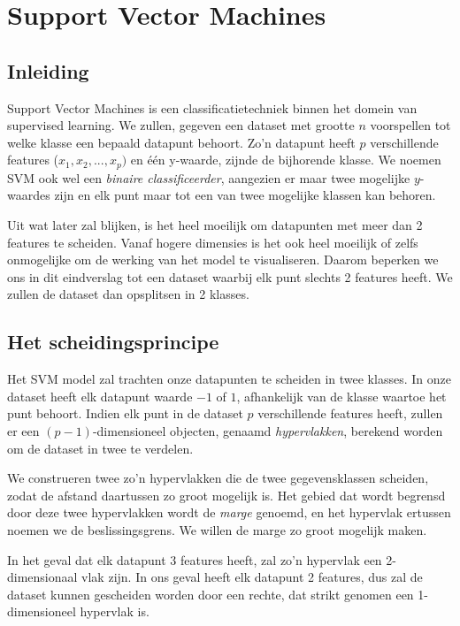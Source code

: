 \documentclass[TeamE-eindrapport]{subfiles}
\begin{document}
	
\chapter{Support Vector Machines}

\section{Inleiding}

Support Vector Machines is een classificatietechniek binnen het domein van supervised learning. We zullen, gegeven een dataset met grootte \(n\) voorspellen tot welke klasse een bepaald datapunt behoort. Zo'n datapunt heeft \(p\) verschillende features (\(x_1, x_2, ..., x_p)\) en één y-waarde, zijnde de bijhorende klasse. We noemen SVM ook wel een \textit{binaire classificeerder}, aangezien er maar twee mogelijke \(y\)-waardes zijn en elk punt maar tot een van twee mogelijke klassen kan behoren.

Uit wat later zal blijken, is het heel moeilijk om datapunten met meer dan 2 features te scheiden. Vanaf hogere dimensies is het ook heel moeilijk of zelfs onmogelijke om de werking van het model te visualiseren. Daarom beperken we ons in dit eindverslag tot een dataset waarbij elk punt slechts 2 features heeft. We zullen de dataset dan opsplitsen in 2 klasses.

\section{Het scheidingsprincipe}

Het SVM model zal trachten onze datapunten te scheiden in twee klasses. In onze dataset heeft elk datapunt waarde \(-1\) of \(1\), afhankelijk van de klasse waartoe het punt behoort. Indien elk punt in de dataset \(p\) verschillende features heeft, zullen er een \((p-1)\)-dimensioneel objecten, genaamd \textit{hypervlakken}, berekend worden om de dataset in twee te verdelen. 

We construeren twee zo'n hypervlakken die de twee gegevensklassen scheiden, zodat de afstand daartussen zo groot mogelijk is. Het gebied dat wordt begrensd door deze twee hypervlakken wordt de \textit{marge} genoemd, en het hypervlak ertussen noemen we de beslissingsgrens. We willen de marge zo groot mogelijk maken.

In het geval dat elk datapunt 3 features heeft, zal zo'n hypervlak een 2-dimensionaal vlak zijn. In ons geval heeft elk datapunt 2 features, dus zal de dataset kunnen gescheiden worden door een rechte, dat strikt genomen een 1-dimensioneel hypervlak is.
\end{document}
